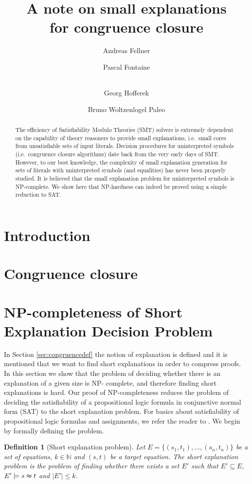 \documentclass{easychair}
\title{A note on small explanations\\ for congruence closure}
\author{Andreas Fellner\inst{1}
   \and Pascal Fontaine\inst{3}
   \and\\ Georg Hofferek
   \and Bruno Woltzenlogel Paleo
}
\institute{ ****
\and ***
\and Inria, U. of Lorraine (France)}
\newtheorem{definition}{Definition}
\begin{document}
\maketitle

\begin{abstract}
The efficiency of Satisfiability Modulo Theories (SMT) solvers is extremely
dependent on the capability of theory reasoners to provide small explanations,
i.e.\ small cores from unsatisfiable sets of input literals.  Decision
procedures for uninterpreted symbols (i.e.\ congruence closure algorithms) date
back from the very early days of SMT.  However, to our best knowledge, the
complexity of small explanation generation for sets of literals with
uninterpreted symbols (and equalities) has never been properly studied.  It is
believed that the small explanation problem for uninterpreted symbols is
NP-complete.  We show here that NP-hardness can indeed be proved using a simple
reduction to SAT.
\end{abstract}


\section*{Introduction}

\section*{Congruence closure}

\section*{NP-completeness of Short Explanation Decision Problem}
\label{sec:npcomplete}

In Section \ref{sec:congruencedef} the notion of explanation is
defined and it is mentioned that we want to find short explanations
in order to compress proofs. In this section we show that the problem
of deciding whether there is an explanation of a given size is NP-
complete, and therefore finding short explanations is hard. Our proof
of NP-completeness reduces the problem of deciding the satisfiability
of a propositional logic formula in conjunctive normal form (SAT) to
the short explanation problem. For basics about satisfiability of
propositional logic formulas and assignments, we refer the reader to
\cite{Biere2009}. We begin by formally defining the problem.


\begin{definition}[Short explanation problem]
Let $E = \{(s_1,t_1),\ldots,(s_n,t_n)\}$ be a set of equations, 
$k \in \mathbb{N}$ and $(s,t)$ be a target equation.  
The \emph{short explanation problem} is the problem of finding 
whether there exists a set $E'$ such that $E' \subseteq E$, 
$E' \models s \thickapprox t$ and $|E'| \leq k$.
\end{definition}
\end{document}
